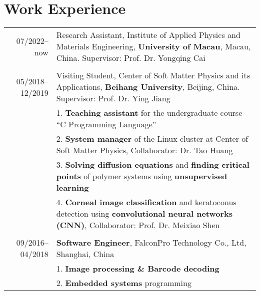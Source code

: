 \documentclass[a4paper,10pt]{article} %
\begin{document}
\section{Work Experience}
\begin{tabular}{r|p{11cm}}
	07/2022--now            & Research Assistant,  Institute of Applied Physics and Materials Engineering, \textbf{University of Macau}, Macau, China. Supervisor: Prof. Dr. Yongqing Cai  \\
	\multicolumn{2}{c}{} \\	%
	05/2018--12/2019            & Visiting Student,  Center of Soft Matter Physics and its Applications, \textbf{Beihang University}, Beijing, China. Supervisor: Prof. Dr. Ying Jiang  \\
	& 1. \textbf{Teaching assistant} for the undergraduate course “C Programming Language” \\
	& 2. \textbf{System manager} of the Linux cluster at Center of Soft Matter Physics, Collaborator: \href{http://taohonker.science/}{Dr. Tao Huang}\\
	& 3. \textbf{Solving diffusion equations} and \textbf{finding critical points} of polymer systems using \textbf{unsupervised learning}\\
	& 4. \textbf{Corneal image classification} and keratoconus detection using \textbf{convolutional neural networks (CNN)}, Collaborator: Prof. Dr. Meixiao Shen\\
	\multicolumn{2}{c}{} \\	%
	09/2016--04/2018            & \textbf{Software Engineer}, FalconPro Technology Co., Ltd, Shanghai, China \\                          & 1. \textbf{Image processing \& Barcode decoding}\\
								& 2. \textbf{Embedded systems} programming\\
\end{tabular}
\end{document}
